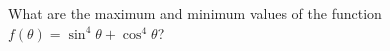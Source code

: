 
%
%
%
%
% 
% 

\question What are the maximum and minimum values of the function $f(\theta) = \sin^4\theta + \cos^4\theta$?

\insertQR{}

\ifprintanswers
\fi 

